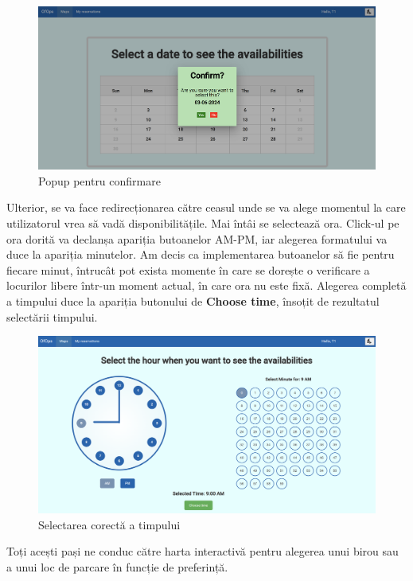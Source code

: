\newpage

\begin{figure}[!htb]
    \centering
    \includegraphics[width=0.9\linewidth]{images/calendar bun.png}
    \caption{Popup pentru confirmare}
    \label{fig:calendarbun}
\end{figure}

Ulterior, se va face redirecționarea către ceasul unde se va alege momentul la care utilizatorul vrea să vadă disponibilitățile. Mai întâi se selectează ora. Click-ul pe ora dorită va declanșa apariția butoanelor AM-PM, iar alegerea formatului va duce la apariția minutelor. Am decis ca implementarea butoanelor să fie pentru fiecare minut, întrucât pot exista momente în care se dorește o verificare a locurilor libere într-un moment actual, în care ora nu este fixă. Alegerea completă a timpului duce la apariția butonului de \textbf{Choose time}, însoțit de rezultatul selectării timpului.

\begin{figure}[!htb]
    \centering
    \includegraphics[width=0.9\linewidth]{images/timp.png}
    \caption{Selectarea corectă a timpului}
    \label{fig:timp}
\end{figure}

Toți acești pași ne conduc către harta interactivă pentru alegerea unui birou sau a unui loc de parcare în funcție de preferință.

